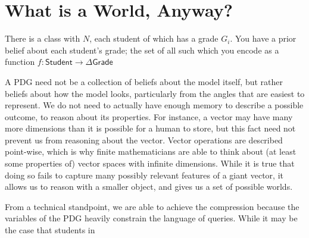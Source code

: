 \documentclass{article}
\theoremstyle{definition}
\theoremstyle{remark}
\newcommand{\var}[1]{\mathsf{#1}}
\begin{document}
\section{What is a World, Anyway?} \label{sec:possible-world}

\begin{example}\label{ex:student}
    There is a class with $N$, each student of which has a grade $G_i$. You have a prior belief about each student's grade; the set of all such which you encode as a function $f:  \var{Student} \to \Delta \var{Grade} $ 
    \begin{center}
    	
    	
    \end{center}    
\end{example}

A PDG need not be a collection of beliefs about the model itself, but rather beliefs about how the model looks, particularly from the angles that are easiest to represent. We do not need to actually have enough memory to describe a possible outcome, to reason about its properties.
For instance, a vector may have many more dimensions than it is possible for a human to store, but this fact need not prevent us from reasoning about the vector. Vector operations are described point-wise, which is why finite mathematicians are able to think about (at least some properties of) vector spaces with infinite dimensions. While it is true that doing so fails to capture many possibly relevant features of a giant vector, it allows us to reason with a smaller object, and gives us a set of possible worlds. 

From a technical standpoint, we are able to achieve the compression because the variables of the PDG heavily constrain the language of queries. While it may be the case that students in 
\end{document}
